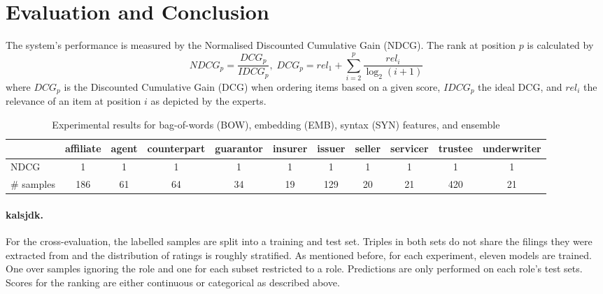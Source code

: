 \section{Evaluation and Conclusion}
The system's performance is measured by the Normalised Discounted Cumulative Gain (NDCG). The rank at position $p$ is calculated by
\begin{equation}
NDCG_p = \frac{DCG_p}{IDCG_p},\;
DCG_p = rel_1 + \sum_{i=2}^{p} \frac{rel_i}{\log_2(i+1)}
\end{equation}
where $DCG_p$ is the Discounted Cumulative Gain (DCG) when ordering items based on a given score, $IDCG_p$ the ideal DCG, and $rel_i$ the relevance of an item at position $i$ as depicted by the experts.

\begin{table*}
	\caption{Experimental results for bag-of-words (BOW), embedding (EMB), syntax (SYN) features, and ensemble}
	\label{tab:roleresults}
	\begin{tabular}{lcccccccccc}
		\toprule
		          & affiliate & agent & counterpart & guarantor & insurer & issuer & seller & servicer & trustee & underwriter \\
		\midrule
		NDCG & 1 & 1 & 1 & 1 & 1 & 1 & 1 & 1 & 1 & 1 \\
	  \# samples & 186       & 61    & 64          & 34        & 19      & 129    & 20     & 21       & 420     & 21          \\
		\bottomrule
	\end{tabular}
\end{table*}

\paragraph{\textbf{kalsjdk.}}
For the cross-evaluation, the labelled samples are split into a training and test set.
Triples in both sets do not share the filings they were extracted from and the distribution of ratings is roughly stratified.
As mentioned before, for each experiment, eleven models are trained. One over samples ignoring the role and one for each subset restricted to a role.
Predictions are only performed on each role's test sets.
Scores for the ranking are either continuous or categorical as described above.

